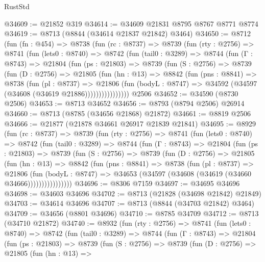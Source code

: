\begin{lexlean}{RustStd}
\begin{coremodule}
@34609 := @21852 @319
@34614 := @34609 @21831 @8795 @8767 @8771 @8774
@34619 := @8713 (@8844 (@34614 @21837 @21842) @3464)
@34650 := @8712
    (fun (fn : @454) =>
    @8738
      (fun (rc : @8737) =>
      @8739
        (fun (rty : @2756) =>
        @8741
          (fun (lets0 : @8740) =>
          @8742
            (fun (tail0 : @3289) =>
            @8744
              (fun (Γ : @8743) =>
              @21804
                (fun (ps : @21803) =>
                @8739
                  (fun (S : @2756) =>
                  @8739
                    (fun (D : @2756) =>
                    @21805
                      (fun (hn : @13) =>
                      @8842
                        (fun (pns : @8841) =>
                        @8738
                          (fun (pl : @8737) =>
                          @21806
                            (fun (bodyL : @8747) =>
                            @34592 (@34597 (@34608 (@34619 @21886))))))))))))))))
    @2506
@34652 := @34590 (@8730 @2506)
@34653 := @8713 @34652
@34656 := @8793 (@8794 @2506) @26914
@34660 := @8713 (@8785 (@34656 @21868) @21872)
@34661 := @8819 @2506
@34666 := @21877 (@21878 @34661 @26917 @21839 @21841)
@34695 := @8929
    (fun (rc : @8737) =>
    @8739
      (fun (rty : @2756) =>
      @8741
        (fun (lets0 : @8740) =>
        @8742
          (fun (tail0 : @3289) =>
          @8744
            (fun (Γ : @8743) =>
            @21804
              (fun (ps : @21803) =>
              @8739
                (fun (S : @2756) =>
                @8739
                  (fun (D : @2756) =>
                  @21805
                    (fun (hn : @13) =>
                    @8842
                      (fun (pns : @8841) =>
                      @8738
                        (fun (pl : @8737) =>
                        @21806
                          (fun (bodyL : @8747) =>
                          @34653 (@34597 (@34608 (@34619 (@34660 @34666))))))))))))))))
@34696 := @8306 @7159
@34697 := @34695 @34696
@34698 := @34603 @34696
@34702 := @8713 (@21828 (@34698 @21842) @21849)
@34703 := @34614 @34696
@34707 := @8713 (@8844 (@34703 @21842) @3464)
@34709 := @34656 (@8801 @34696)
@34710 := @8785 @34709
@34712 := @8713 (@34710 @21872)
@34740 := @8932
    (fun (rty : @2756) =>
    @8741
      (fun (lets0 : @8740) =>
      @8742
        (fun (tail0 : @3289) =>
        @8744
          (fun (Γ : @8743) =>
          @21804
            (fun (ps : @21803) =>
            @8739
              (fun (S : @2756) =>
              @8739
                (fun (D : @2756) =>
                @21805
                  (fun (hn : @13) =>

\end{coremodule}
\end{lexlean}

